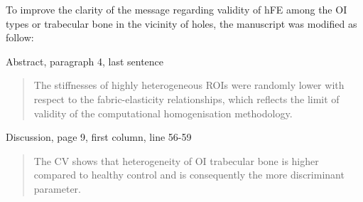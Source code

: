 \documentclass{AR2RC}
\begin{document}

To improve the clarity of the message regarding validity of hFE among the OI types or trabecular bone in the vicinity of holes, the manuscript was modified as follow:

Abstract, paragraph 4, last sentence
\begin{quote}
	The stiffnesses of highly heterogeneous ROIs were randomly lower with respect to the fabric-elasticity relationships, which reflects the limit of validity of the computational homogenisation methodology. 
\end{quote}

Discussion, page 9, first column, line 56-59
\begin{quote}
	The CV shows that heterogeneity of OI trabecular bone is higher compared to healthy control and is consequently the more discriminant parameter. 
\end{quote}
\end{document}
